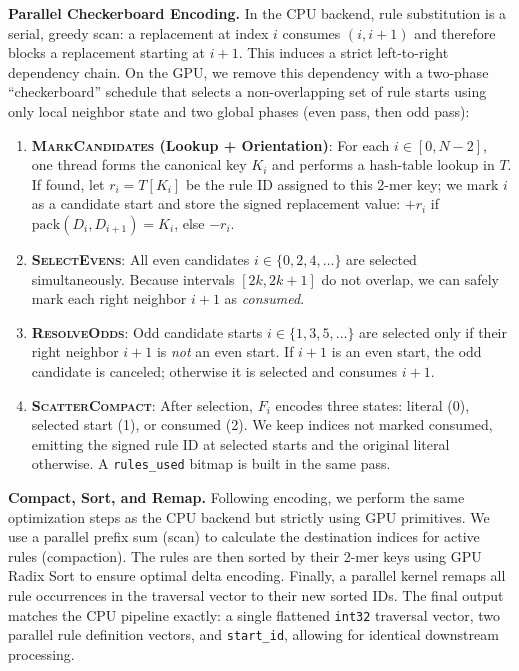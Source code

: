 \noindent \textbf{Parallel Checkerboard Encoding.}
In the CPU backend, rule substitution is a serial, greedy scan: a replacement at index $i$ consumes $(i,i+1)$ and therefore blocks a replacement starting at $i+1$. This induces a strict left-to-right dependency chain. On the GPU, we remove this dependency with a two-phase ``checkerboard'' schedule that selects a non-overlapping set of rule starts using only local neighbor state and two global phases (even pass, then odd pass):
\begin{enumerate}[noitemsep, topsep=2pt, leftmargin=*]
  \item \textbf{\textsc{MarkCandidates} (Lookup + Orientation)}: For each $i\in[0,N-2]$, one thread forms the canonical key $K_i$ and performs a hash-table lookup in $T$. If found, let $r_i = T[K_i]$ be the rule ID assigned to this 2-mer key; we mark $i$ as a candidate start and store the signed replacement value: $+r_i$ if $\text{pack}(D_i,D_{i+1})=K_i$, else $-r_i$.
  \item \textbf{\textsc{SelectEvens}}: All even candidates $i\in\{0,2,4,\dots\}$ are selected simultaneously. Because intervals $[2k,2k+1]$ do not overlap, we can safely mark each right neighbor $i{+}1$ as \emph{consumed}.
  \item \textbf{\textsc{ResolveOdds}}: Odd candidate starts $i\in\{1,3,5,\dots\}$ are selected only if their right neighbor $i{+}1$ is \emph{not} an even start. If $i{+}1$ is an even start, the odd candidate is canceled; otherwise it is selected and consumes $i{+}1$.
  \item \textbf{\textsc{ScatterCompact}}: After selection, $F_i$ encodes three states: literal (0), selected start (1), or consumed (2). We keep indices not marked consumed, emitting the signed rule ID at selected starts and the original literal otherwise. A \texttt{rules\_used} bitmap is built in the same pass.
\end{enumerate}



\noindent \textbf{Compact, Sort, and Remap.}
Following encoding, we perform the same optimization steps as the CPU backend but strictly using GPU primitives. We use a parallel prefix sum (scan) to calculate the destination indices for active rules (compaction). The rules are then sorted by their 2-mer keys using GPU Radix Sort to ensure optimal delta encoding. Finally, a parallel kernel remaps all rule occurrences in the traversal vector to their new sorted IDs. The final output matches the CPU pipeline exactly: a single flattened \texttt{int32} traversal vector, two parallel rule definition vectors, and \texttt{start\_id}, allowing for identical downstream processing.

